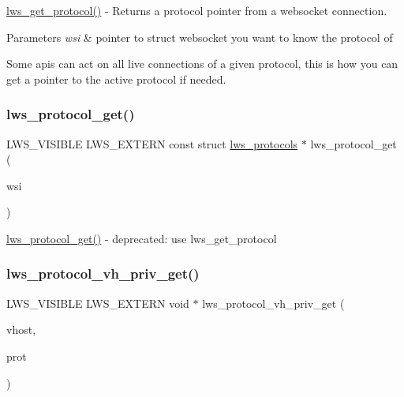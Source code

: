 \hyperlink{group__Protocols-and-Plugins_ga72ad550786ca7976463589d347e62112}{lws\+\_\+get\+\_\+protocol()} -\/ Returns a protocol pointer from a websocket connection. 
\begin{DoxyParams}{Parameters}
{\em wsi} & pointer to struct websocket you want to know the protocol of\\
\hline
\end{DoxyParams}
Some apis can act on all live connections of a given protocol, this is how you can get a pointer to the active protocol if needed. \mbox{\label{group__Protocols-and-Plugins_ga181a7e600f9d921f483b05483d528fd8}} 
\subsubsection{\texorpdfstring{lws\+\_\+protocol\+\_\+get()}{lws\_protocol\_get()}}
{\footnotesize\ttfamily L\+W\+S\+\_\+\+V\+I\+S\+I\+B\+LE L\+W\+S\+\_\+\+E\+X\+T\+E\+RN const struct \hyperlink{structlws__protocols}{lws\+\_\+protocols} $\ast$ lws\+\_\+protocol\+\_\+get (\begin{DoxyParamCaption}\item[{struct \hyperlink{structlws}{lws} $\ast$}]{wsi }\end{DoxyParamCaption})}

\hyperlink{group__Protocols-and-Plugins_ga181a7e600f9d921f483b05483d528fd8}{lws\+\_\+protocol\+\_\+get()} -\/ deprecated\+: use lws\+\_\+get\+\_\+protocol \mbox{\label{group__Protocols-and-Plugins_ga7e8d95fccf8654f5a0b6beadd7c8dbf1}} 
\subsubsection{\texorpdfstring{lws\+\_\+protocol\+\_\+vh\+\_\+priv\+\_\+get()}{lws\_protocol\_vh\_priv\_get()}}
{\footnotesize\ttfamily L\+W\+S\+\_\+\+V\+I\+S\+I\+B\+LE L\+W\+S\+\_\+\+E\+X\+T\+E\+RN void $\ast$ lws\+\_\+protocol\+\_\+vh\+\_\+priv\+\_\+get (\begin{DoxyParamCaption}\item[{struct lws\+\_\+vhost $\ast$}]{vhost,  }\item[{const struct \hyperlink{structlws__protocols}{lws\+\_\+protocols} $\ast$}]{prot }\end{DoxyParamCaption})}

